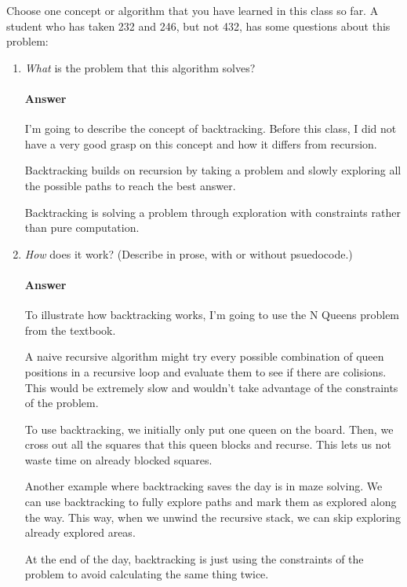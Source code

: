 \documentclass{article}
\begin{document}

Choose one concept or algorithm that you have learned
in this class so far. A student who has
taken 232 and 246, but not 432, has some questions about this problem:

\begin{enumerate}
    \item \emph{What} is the problem that this algorithm solves?

        \paragraph{Answer}
        I'm going to describe the concept of backtracking. Before this class, I did
        not have a very good grasp on this concept and how it differs from recursion.

        Backtracking builds on recursion by taking a problem and slowly exploring
        all the possible paths to reach the best answer.

        Backtracking is solving a problem through exploration with constraints rather than pure
        computation.

    \item \emph{How} does it work? (Describe in prose, with or without
        psuedocode.)

        \paragraph{Answer}
        To illustrate how backtracking works, I'm going to use the N Queens problem
        from the textbook.

        A naive recursive algorithm might try every possible combination of queen
        positions in a recursive loop and evaluate them to see if there are colisions. This would be
        extremely slow and wouldn't take advantage of the constraints of the problem.

        To use backtracking, we initially only put one queen on the board. Then,
        we cross out all the squares that this queen blocks and recurse. This lets
        us not waste time on already blocked squares.

        Another example where backtracking saves the day is in maze solving. We
        can use backtracking to fully explore paths and mark them as explored along
        the way. This way, when we unwind the recursive stack, we can skip exploring
        already explored areas.

        At the end of the day, backtracking is just using the constraints of the
        problem to avoid calculating the same thing twice.

\end{enumerate}
\end{document}

